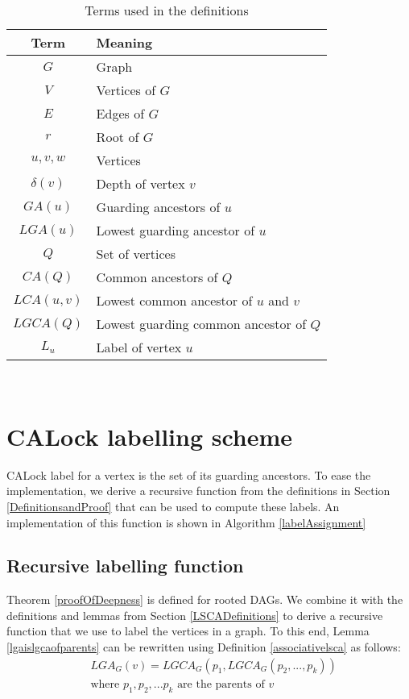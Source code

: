\begin{table}[ht]
    \centering
	\captionsetup{justification=centering}
	\caption{Terms used in the definitions}
	\begin{tabular}{c l}
		\textbf{Term} & \textbf{Meaning} \\
		\hline 
		$G$ & Graph \\
		$V$ & Vertices of $G$\\
		$E$ & Edges of $G$\\
		$r$ & Root of $G$\\
		$u, v, w$& Vertices \\
		$\delta(v)$ & Depth of vertex $v$\\
		$GA(u)$ & Guarding ancestors of $u$\\
		$LGA(u)$ & Lowest guarding ancestor of $u$\\
		$Q$ & Set of vertices\\
		$CA(Q)$ & Common ancestors of $Q$\\
		$LCA(u,v)$ & Lowest common ancestor of $u$ and $v$\\
		$LGCA(Q)$ & Lowest guarding common ancestor of $Q$\\
		$L_u$ & Label of vertex $u$\\
	\end{tabular}\\
	\label{definitionsLegend}
\end{table}

\section{CALock labelling scheme} \label{sec:labellingScheme}
CALock label for a vertex is the set of its guarding ancestors. 
To ease the implementation, we derive a recursive function from the definitions in Section \ref{DefinitionsandProof} that can be used to compute these labels. 
An implementation of this function is shown in Algorithm \ref{labelAssignment}
\subsection{Recursive labelling function} \label{labellingScheme}
Theorem \ref{proofOfDeepness} is defined for rooted DAGs. We combine it with the definitions and lemmas from Section \ref{LSCADefinitions} to derive a recursive function that we use to label the vertices in a graph. To this end,
Lemma \ref{lgaislgcaofparents} can be rewritten using Definition \ref{associativelsca} as follows:
\begin{equation}\label{eqn1}
\begin{split}
    &{LGA_G(v) = LGCA_G (p_1, LGCA_G (p_2,...,p_k))}
    \\ &\text{where } p_1, p_2, ... p_k \text{ are the parents of } v
\end{split}
\end{equation}

